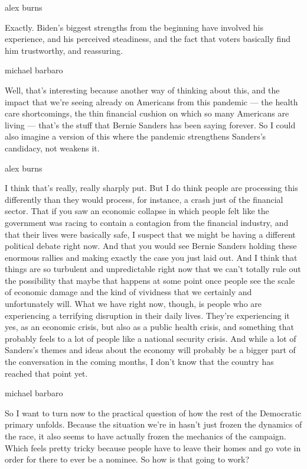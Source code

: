 alex burns

Exactly. Biden's biggest strengths from the beginning have involved his
experience, and his perceived steadiness, and the fact that voters
basically find him trustworthy, and reassuring.

michael barbaro

Well, that's interesting because another way of thinking about this, and
the impact that we're seeing already on Americans from this pandemic ---
the health care shortcomings, the thin financial cushion on which so
many Americans are living --- that's the stuff that Bernie Sanders has
been saying forever. So I could also imagine a version of this where the
pandemic strengthens Sanders's candidacy, not weakens it.

alex burns

I think that's really, really sharply put. But I do think people are
processing this differently than they would process, for instance, a
crash just of the financial sector. That if you saw an economic collapse
in which people felt like the government was racing to contain a
contagion from the financial industry, and that their lives were
basically safe, I suspect that we might be having a different political
debate right now. And that you would see Bernie Sanders holding these
enormous rallies and making exactly the case you just laid out. And I
think that things are so turbulent and unpredictable right now that we
can't totally rule out the possibility that maybe that happens at some
point once people see the scale of economic damage and the kind of
vividness that we certainly and unfortunately will. What we have right
now, though, is people who are experiencing a terrifying disruption in
their daily lives. They're experiencing it yes, as an economic crisis,
but also as a public health crisis, and something that probably feels to
a lot of people like a national security crisis. And while a lot of
Sanders's themes and ideas about the economy will probably be a bigger
part of the conversation in the coming months, I don't know that the
country has reached that point yet.

michael barbaro

So I want to turn now to the practical question of how the rest of the
Democratic primary unfolds. Because the situation we're in hasn't just
frozen the dynamics of the race, it also seems to have actually frozen
the mechanics of the campaign. Which feels pretty tricky because people
have to leave their homes and go vote in order for there to ever be a
nominee. So how is that going to work?

